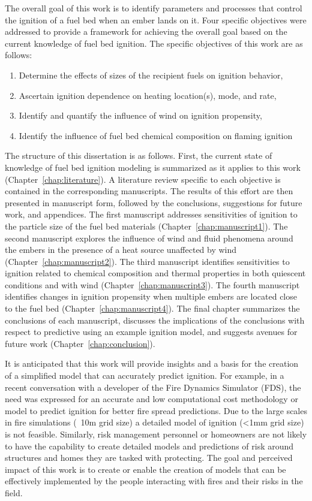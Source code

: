     The overall goal of this work is to identify parameters and processes that control the ignition of a fuel bed when an ember lands on it. Four specific objectives were addressed to provide a framework for achieving the overall goal based on the current knowledge of fuel bed ignition. The specific objectives of this work are as follows:
        \begin{enumerate}
            \item Determine the effects of sizes of the recipient fuels on ignition behavior,
            \item Ascertain ignition dependence on heating location(s), mode, and rate,
            \item Identify and quantify the influence of wind on ignition propensity,
            \item Identify the influence of fuel bed chemical composition on flaming ignition
        \end{enumerate}
    The structure of this dissertation is as follows. First, the current state of knowledge of fuel bed ignition modeling is summarized as it applies to this work (Chapter~\ref{chap:literature}). A literature review specific to each objective is contained in the corresponding manuscripts. The results of this effort are then presented in manuscript form, followed by the conclusions, suggestions for future work, and appendices. The first manuscript addresses sensitivities of ignition to the particle size of the fuel bed materials (Chapter~\ref{chap:manuscript1}). The second manuscript explores the influence of wind and fluid phenomena around the embers in the presence of a heat source unaffected by wind (Chapter~\ref{chap:manuscript2}). The third manuscript identifies sensitivities to ignition related to chemical composition and thermal properties in both quiescent conditions and with wind (Chapter~\ref{chap:manuscript3}). The fourth manuscript identifies changes in ignition propensity when multiple embers are located close to the fuel bed (Chapter~\ref{chap:manuscript4}). The final chapter summarizes the conclusions of each manuscript, discusses the implications of the conclusions with respect to predictive using an example ignition model, and suggests avenues for future work (Chapter~\ref{chap:conclusion}). 
    
    It is anticipated that this work will provide insights and a basis for the creation of a simplified model that can accurately predict ignition. For example, in a recent conversation with a developer of the Fire Dynamics Simulator (FDS), the need was expressed for an accurate and low computational cost methodology or model to predict ignition for better fire spread predictions. Due to the large scales in fire simulations (~10\si{\meter} grid size) a detailed model of ignition (<1\si{\milli\meter} grid size) is not feasible. Similarly, risk management personnel or homeowners are not likely to have the capability to create detailed models and predictions of risk around structures and homes they are tasked with protecting. The goal and perceived impact of this work is to create or enable the creation of models that can be effectively implemented by the people interacting with fires and their risks in the field. 